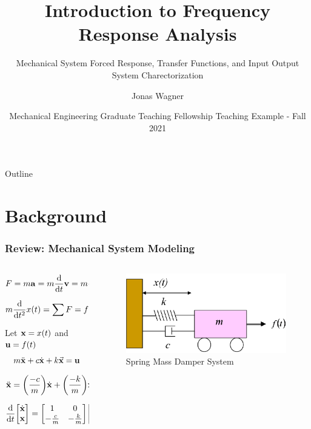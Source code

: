 \documentclass[aspectratio=169]{beamer}
\title[Frequency Response Analysis]{Introduction to Frequency Response Analysis}
\subtitle{Mechanical System Forced Response, Transfer Functions, and Input Output System Charectorization}
\author{Jonas Wagner}
\institute[UTDallas]{Univeristy of Texas at Dallas}
\date[ME GTF Interview - Fall 2021]{Mechanical Engineering Graduate Teaching Fellowship Teaching Example - Fall 2021}
\begin{document}
	
\begin{frame}
	\titlepage
\end{frame}


\begin{frame}{Outline}
	\tableofcontents
	\note{

	}
\end{frame}

\section{Background}
\begin{frame}
	\frametitle{Review: Mechanical System Modeling}
	\begin{columns}
		\begin{column}{0.5 \textwidth}
			\[F = m \vb{a} = m \dv{t} \vb{v} = m \dv{t} \qty(\dv{t} \vb{x})\]
			\[
				m \dv{t^2} x(t) 
				= \sum F 
				= f(t) - b \dv{t} x(t) - k x(t)
			\]

			Let $\vb{x} = x(t)$ and $\vb{u} = f(t)$
			\[
				m \ddot{\vb{x}} + c \dot{\vb{x}} + k \va{x} = \vb{u}
			\]
			\[
				\ddot{\vb{x}} 
				= \qty(\frac{-c}{m}) \dot{\vb{x}} + \qty(\frac{-k}{m}) \vb{x} + \qty(\cfrac{1}{m}) \vb{u}
			\]
			\[
				\dv{t} \mqty[
					\dot{\vb{x}}\\ 
					\vb{x}
				 ] = 
				\mqty[
					1 &0\\
					-\frac{c}{m} &-\frac{k}{m}
					] 
				\mqty[
					\dot{\vb{x}}\\
					\vb{x}
				]
				+ \mqty[
					0\\
					\frac{1}{m}
				]
				\mqty[\vb{u}]
			\]
		\end{column}
		\begin{column}{0.375 \textwidth}
			\begin{figure}[]
				\includegraphics[width=\textwidth]{Images/SpringMassDamper_cartSystem.png}
				Spring Mass Damper System \cite{ctms_engin_umich_SystemModeling}
			\end{figure}
		\end{column}
	\end{columns}
	\note{

	}
\end{frame}
\end{document}
